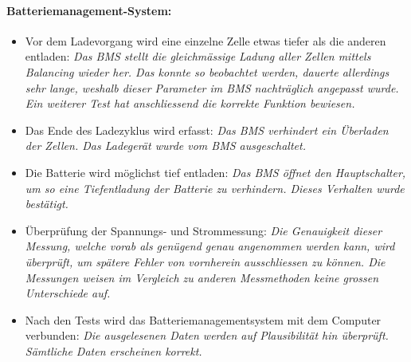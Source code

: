 \paragraph{Batteriemanagement-System:} \begin{itemize}
	\item Vor dem Ladevorgang wird eine einzelne Zelle etwas tiefer als die anderen entladen: \textit{Das BMS stellt die gleichmässige Ladung aller Zellen mittels Balancing wieder her. Das konnte so beobachtet werden, dauerte allerdings sehr lange, weshalb dieser Parameter im BMS nachträglich angepasst wurde. Ein weiterer Test hat anschliessend die korrekte Funktion bewiesen.}
	\item Das Ende des Ladezyklus wird erfasst: \textit{Das BMS verhindert ein Überladen der Zellen. Das Ladegerät wurde vom BMS ausgeschaltet.}
	\item Die Batterie wird möglichst tief entladen: \textit{Das BMS öffnet den Hauptschalter, um so eine Tiefentladung der Batterie zu verhindern. Dieses Verhalten wurde bestätigt.}
\newpage
	\item Überprüfung der Spannungs- und Strommessung: \textit{Die Genauigkeit dieser Messung, welche vorab als genügend genau angenommen werden kann, wird überprüft, um spätere Fehler von vornherein ausschliessen zu können. Die Messungen weisen im Vergleich zu anderen Messmethoden keine grossen Unterschiede auf.}
	\item Nach den Tests wird das Batteriemanagementsystem mit dem Computer verbunden: \textit{Die ausgelesenen Daten werden auf Plausibilität hin überprüft. Sämtliche Daten erscheinen korrekt.}
\end{itemize}


\newpage